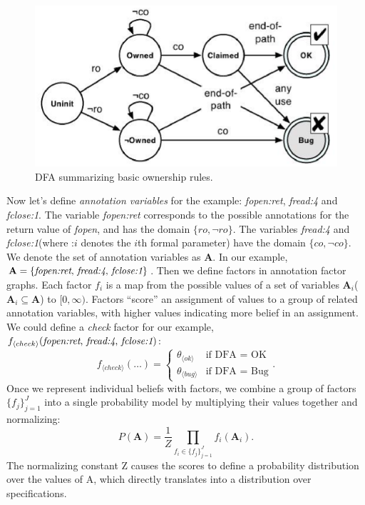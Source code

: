 \begin{figure}[htbp]
\centering
\includegraphics[scale=0.4]{fig.eps}
\caption{DFA summarizing basic ownership rules.}
\label{fig}
\end{figure}

Now let's define {\it annotation variables} for the example: {\it fopen:ret}, {\it fread:4} and {\it fclose:1}. The variable {\it fopen:ret} corresponds to the possible annotations for the return value of {\it fopen}, and has the domain $\{ro, \neg ro\}$. The variables {\it fread:4} and {\it fclose:1}(where :$i$ denotes the $i$th formal parameter) have the domain $\{co, \neg co\}$. We denote the set of annotation variables as $\mathbf{A}$. In our example, $\mathbf{A} = \{\textrm{{\it fopen:ret}, {\it fread:4}, {\it fclose:1}}\}$. Then we define factors in annotation factor graphs. Each factor $f_i$ is a map from the possible values of a set of variables $\mathbf{A}_i$($\mathbf{A}_i \subseteq \mathbf{A}$) to $[0, \infty)$. Factors ``score'' an assignment of values to a group of related annotation variables, with higher values indicating more belief in an assignment. We could define a {\it check} factor for our example, $f_{\langle check \rangle}(\textrm{{\it fopen:ret}, {\it fread:4}, {\it fclose:1}})$:
$$f_{\langle check \rangle}(\dots) = \left\{\begin{array}{ll} \theta_{\langle ok \rangle} & \textrm{if DFA = OK} \\ \theta_{\langle bug \rangle} & \textrm{if DFA = Bug} \end{array}\right..$$
Once we represent individual beliefs with factors, we combine a group of factors $\{f_j\}^J_{j=1}$ into a single probability model by multiplying their values together and normalizing:
$$P(\mathbf{A}) = \frac{1}{Z} \prod_{f_i\in \{f_j\}^J_{j=1}} f_i(\mathbf{A}_i).$$
The normalizing constant Z causes the scores to define a probability distribution over the values of A, which directly translates into a distribution over specifications. 

